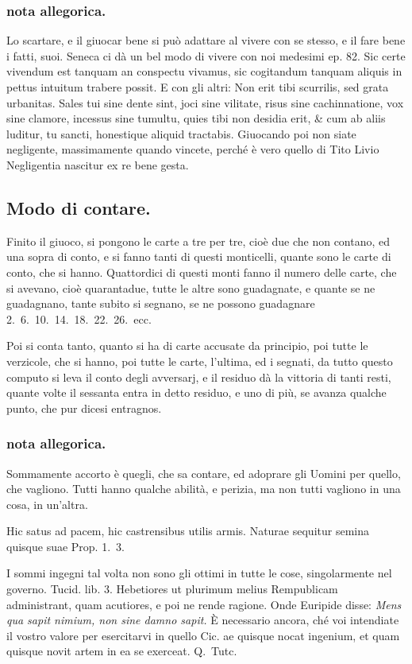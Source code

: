 \documentclass[11pt,a6paper]{article}
\begin{document}
\subsubsection{nota allegorica.}
{\footnotesize
Lo scartare, e il giuocar bene si può adattare al
vivere con se stesso, e il fare bene i fatti, suoi.
Seneca ci dà un bel modo di vivere con noi medesimi
ep. 82. Sic certe vivendum est tanquam
an conspectu vivamus, sic cogitandum tanquam aliquis
in pettus intuitum trabere possit. E con gli altri:
Non erit tibi scurrilis, sed grata urbanitas.
Sales tui sine dente sint, joci sine vilitate, risus sine
cachinnatione, vox sine clamore, incessus sine tumultu,
quies tibi non desidia erit, \& cum ab aliis
luditur, tu sancti, honestique aliquid tractabis.
Giuocando poi non siate negligente, massimamente
quando vincete, perché è vero quello di Tito Livio
Negligentia nascitur ex re bene gesta.
}
\subsection{Modo di contare.}

Finito il giuoco, si pongono le carte a tre
per tre, cioè due che non contano, ed
una sopra di conto, e si fanno tanti di questi
monticelli, quante sono le carte di conto,
che si hanno. Quattordici di questi monti
fanno il numero delle carte, che si avevano,
cioè quarantadue, tutte le altre sono guadagnate,
e quante se ne guadagnano, tante subito
si segnano, se ne possono guadagnare
2.\ 6.\ 10.\ 14.\ 18.\ 22.\ 26.\ ecc.

Poi si conta tanto, quanto si ha di carte
accusate da principio, poi tutte le verzicole,
che si hanno, poi tutte le carte, l'ultima, ed
i segnati, da tutto questo computo si leva il
conto degli avversarj, e il residuo dà la vittoria
di tanti resti, quante volte il sessanta
entra in detto residuo, e uno di più, se avanza
qualche punto, che pur dicesi entragnos.

\subsubsection{nota allegorica.}
{\footnotesize
Sommamente accorto è quegli, che sa contare,
ed adoprare gli Uomini per quello, che vagliono.
Tutti hanno qualche abilità, e perizia, ma non tutti
vagliono in una cosa, in un'altra.

Hic satus ad pacem, hic castrensibus utilis armis.
Naturae sequitur semina quisque suae Prop. 1.\ 3.

I sommi ingegni tal volta non sono gli ottimi
in tutte le cose, singolarmente nel governo. Tucid.
lib. 3. Hebetiores ut plurimum melius Rempublicam
administrant, quam acutiores, e poi ne rende
ragione. Onde Euripide disse:
\textit{
Mens qua sapit nimium, non sine damno sapit.}
È necessario ancora, ché voi intendiate il vostro valore
per esercitarvi in quello Cic. ae quisque nocat
ingenium, et quam quisque novit artem in ea
se exerceat. Q.\ Tutc.
}
\end{document}
